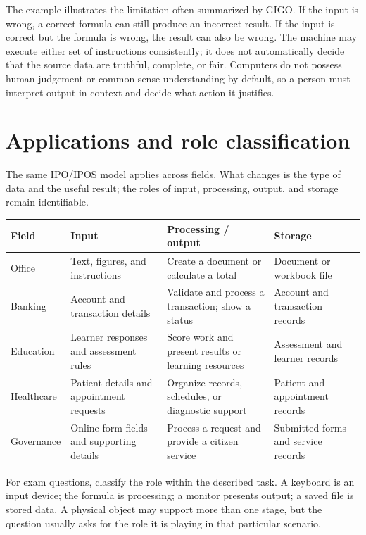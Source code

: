 The example illustrates the limitation often summarized by GIGO. If the
input is wrong, a correct formula can still produce an incorrect result. If
the input is correct but the formula is wrong, the result can also be wrong.
The machine may execute either set of instructions consistently; it does not
automatically decide that the source data are truthful, complete, or fair.
Computers do not possess human judgement or common-sense understanding by
default, so a person must interpret output in context and decide what action
it justifies.

\section{Applications and role classification}
The same IPO/IPOS model applies across fields. What changes is the type of
data and the useful result; the roles of input, processing, output, and
storage remain identifiable.

\begin{center}
\begin{tabular}{p{}p{}p{}p{}}
\toprule
\textbf{Field} & \textbf{Input} & \textbf{Processing / output} & \textbf{Storage}\\
\midrule
Office & Text, figures, and instructions & Create a document or calculate a total & Document or workbook file\\
Banking & Account and transaction details & Validate and process a transaction; show a status & Account and transaction records\\
Education & Learner responses and assessment rules & Score work and present results or learning resources & Assessment and learner records\\
Healthcare & Patient details and appointment requests & Organize records, schedules, or diagnostic support & Patient and appointment records\\
Governance & Online form fields and supporting details & Process a request and provide a citizen service & Submitted forms and service records\\
\bottomrule
\end{tabular}
\end{center}

For exam questions, classify the role within the described task. A keyboard
is an input device; the formula is processing; a monitor presents output; a
saved file is stored data. A physical object may support more than one
stage, but the question usually asks for the role it is playing in that
particular scenario.

